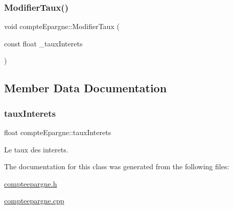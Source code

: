 \mbox{\label{classcompte_epargne_ab25d2e0166cb198065edb876840465a7}} 
\subsubsection{\texorpdfstring{Modifier\+Taux()}{ModifierTaux()}}
{\footnotesize\ttfamily void compte\+Epargne\+::\+Modifier\+Taux (\begin{DoxyParamCaption}\item[{const float}]{\+\_\+taux\+Interets }\end{DoxyParamCaption})}



\subsection{Member Data Documentation}
\mbox{\label{classcompte_epargne_a12c7684e827cd393104d36ed09161df3}} 
\subsubsection{\texorpdfstring{taux\+Interets}{tauxInterets}}
{\footnotesize\ttfamily float compte\+Epargne\+::taux\+Interets\hspace{0.3cm}{\ttfamily [protected]}}



Le taux des interets. 



The documentation for this class was generated from the following files\+:\begin{DoxyCompactItemize}
\item 
\hyperlink{compteepargne_8h}{compteepargne.\+h}\item 
\hyperlink{compteepargne_8cpp}{compteepargne.\+cpp}\end{DoxyCompactItemize}
